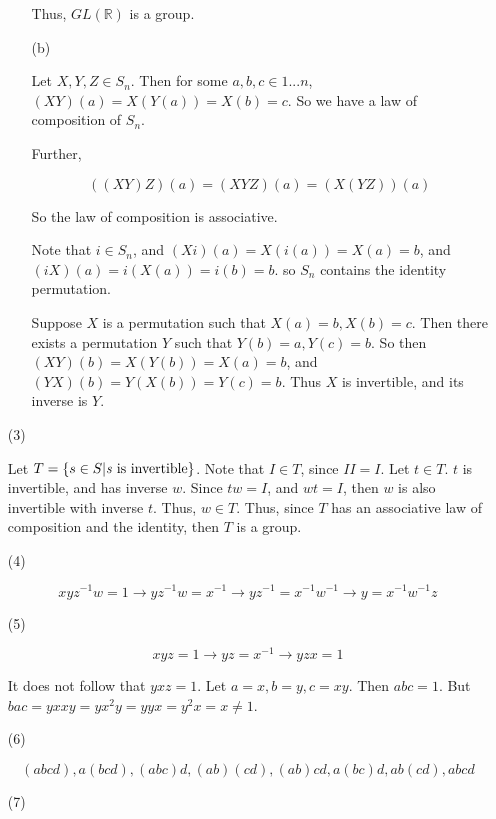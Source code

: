 \documentclass[12pt]{article}
\begin{document}
\begin{itemize}
\begin{itemize}
Thus, $GL(\mathbb{R})$ is a group.

\item[(b)]

Let $X, Y, Z \in S_n$. Then for some $a, b, c \in 1...n$, $(XY)(a) = X(Y(a)) = X(b) = c$. So we have a law of composition of $S_n$.



Further,

$$((XY)Z)(a) = (XYZ)(a) = (X(YZ))(a)$$

So the law of composition is associative.



Note that $i \in S_n$, and $(Xi)(a) = X(i(a)) = X(a) = b$, and $(iX)(a) = i(X(a)) = i(b) = b$. so $S_n$ contains the identity permutation.



Suppose $X$ is a permutation such that $X(a) = b, X(b) = c$. Then there exists a permutation $Y$ such that $Y(b) = a, Y(c) = b$. So then $(XY)(b) = X(Y(b)) = X(a) = b$, and $(YX)(b) = Y(X(b)) = Y(c) = b$. Thus $X$ is invertible, and its inverse is $Y$.

\end{itemize}

\item[(3)]

Let $T = \left\lbrace s \in S | \text{\emph{s} is invertible} \right\rbrace$. Note that $I \in T$, since $II = I$. Let $t \in T$. $t$ is invertible, and has inverse $w$. Since $tw = I$, and $wt = I$, then $w$ is also invertible with inverse $t$. Thus, $w \in T$. Thus, since $T$ has an associative law of composition and the identity, then $T$ is a group.

\item[(4)]

$$xyz^{-1}w = 1 \rightarrow yz^{-1}w = x^{-1} \rightarrow yz^{-1} = x^{-1}w^{-1} \rightarrow y = x^{-1}w^{-1}z$$

\item[(5)]

$$xyz = 1 \rightarrow yz = x^{-1} \rightarrow yzx = 1$$

It does not follow that $yxz = 1$. Let $a = x, b = y, c = xy$. Then $abc = 1$. But $bac = yxxy = yx^2y = yyx = y^2x = x \neq 1$.

\item[(6)]

$$(abcd), a(bcd), (abc)d, (ab)(cd), (ab)cd, a(bc)d, ab(cd), abcd$$

\item[(7)]


\end{itemize}
\end{document}

